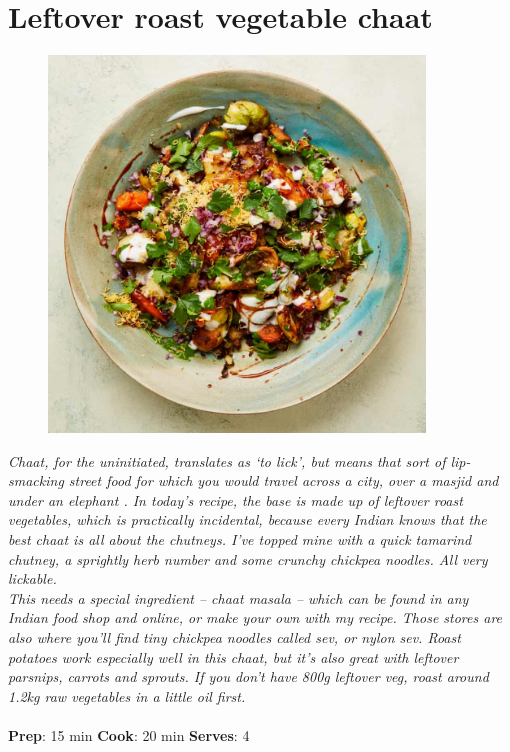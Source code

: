 \documentclass{book}
\begin{document}
\section{Leftover roast vegetable chaat}
\begin{figure}
\centering\includegraphics[width=10cm,height=10cm,keepaspectratio]{Recipe_Pictures/Leftover_roast_vegetable_chaat.png}
\end{figure}
\emph{Chaat, for the uninitiated, translates as ‘to lick’, but means that sort of lip-smacking street food for which you would travel across a city, over a masjid and under an elephant . In today’s recipe, the base is made up of leftover roast vegetables, which is practically incidental, because every Indian knows that the best chaat is all about the chutneys. I’ve topped mine with a quick tamarind chutney, a sprightly herb number and some crunchy chickpea noodles. All very lickable.\\ 
This needs a special ingredient – chaat masala – which can be found in any Indian food shop and online, or make your own with my recipe. Those stores are also where you’ll find tiny chickpea noodles called sev, or nylon sev. Roast potatoes work especially well in this chaat, but it’s also great with leftover parsnips, carrots and sprouts. If you don’t have 800g leftover veg, roast around 1.2kg raw vegetables in a little oil first.}\\\\ 
\textbf{Prep}: 15 min
\textbf{Cook}: 20 min
\textbf{Serves}: 4
\end{document}
